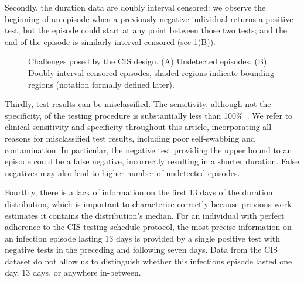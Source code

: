 \documentclass[12pt]{article}
\begin{document}

Secondly, the duration data are doubly interval censored: we observe the beginning of an episode when a previously negative individual returns a positive test, but the episode could start at any point between those two tests; and the end of the episode is similarly interval censored (see \cref{fig:challenges}(B)).

\begin{figure}
  \caption{%
    Challenges posed by the CIS design.
    (A) Undetected episodes.
    (B) Doubly interval censored episodes, shaded regions indicate bounding regions (notation formally defined later).
  }
  \label{fig:challenges}
\end{figure}


Thirdly, test results can be misclassified.
The sensitivity, although not the specificity, of the testing procedure is substantially less than 100\%~\citep{cisMethodsONS}.
We refer to clinical sensitivity and specificity throughout this article, incorporating all reasons for misclassified test results, including poor self-swabbing and contamination.
In particular, the negative test providing the upper bound to an episode could be a false negative, incorrectly resulting in a shorter duration.
False negatives may also lead to higher number of undetected episodes.

Fourthly, there is a lack of information on the first 13 days of the duration distribution, which is important to characterise correctly because previous work estimates it contains the distribution's median.
For an individual with perfect adherence to the CIS testing schedule protocol, the most precise information on an infection episode lasting 13 days is provided by a single positive test with negative tests in the preceding and following seven days.
Data from the CIS dataset do not allow us to distinguish whether this infections episode lasted one day, 13 days, or anywhere in-between.
\end{document}
